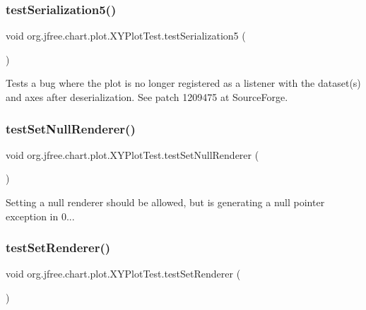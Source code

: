 \subsubsection{\texorpdfstring{test\+Serialization5()}{testSerialization5()}}
{\footnotesize\ttfamily void org.\+jfree.\+chart.\+plot.\+X\+Y\+Plot\+Test.\+test\+Serialization5 (\begin{DoxyParamCaption}{ }\end{DoxyParamCaption})}

Tests a bug where the plot is no longer registered as a listener with the dataset(s) and axes after deserialization. See patch 1209475 at Source\+Forge. \mbox{\label{classorg_1_1jfree_1_1chart_1_1plot_1_1_x_y_plot_test_a16ea90acb1d498a20a2005be1919cc65}} 
\subsubsection{\texorpdfstring{test\+Set\+Null\+Renderer()}{testSetNullRenderer()}}
{\footnotesize\ttfamily void org.\+jfree.\+chart.\+plot.\+X\+Y\+Plot\+Test.\+test\+Set\+Null\+Renderer (\begin{DoxyParamCaption}{ }\end{DoxyParamCaption})}

Setting a null renderer should be allowed, but is generating a null pointer exception in 0... \mbox{\label{classorg_1_1jfree_1_1chart_1_1plot_1_1_x_y_plot_test_aa79ceee951f6869ee48e26c538a26636}} 
\subsubsection{\texorpdfstring{test\+Set\+Renderer()}{testSetRenderer()}}
{\footnotesize\ttfamily void org.\+jfree.\+chart.\+plot.\+X\+Y\+Plot\+Test.\+test\+Set\+Renderer (\begin{DoxyParamCaption}{ }\end{DoxyParamCaption})}

